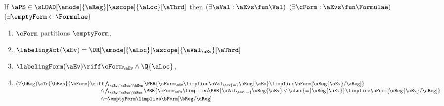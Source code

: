 \begin{scope}
  \smallskip
  \noindent
  \begin{minipage}{1.0\linewidth}
  If $\aPS \in \sLOAD[\amode]{\aReg}[\ascope]{\aLoc}[\aThrd]$ then
  $(\exists\aVal:\aEvs\fun\Val)$
  $(\exists\cForm:\aEvs\fun\Formulae)$ 
  $(\exists\emptyForm\in\Formulae)$
  \begin{multicols}{2}
  \begin{enumerate}[topsep=0pt,label=(\textsc{r}\arabic*),ref=\textsc{r}\arabic*]
  \item \label{read-E-ca}
    $\cForm$ partitions $\emptyForm$,
  \item \label{read-lambda-ca}
    $\labelingAct(\aEv) = \DR[\amode]{\aLoc}[\ascope]{\aVal_\aEv}[\aThrd]$
  \item \label{read-kappa-ca}
    \begin{math}
      \labelingForm(\aEv) \riff      
      \cForm_\aEv
      \land\Q{\aLoc}
    \end{math},
  \item \label{read-tau-ca}
    \begin{math}
      \begin{aligned}[t]
        (\forall\bReg)
        \aTr{\bEvs}{\bForm} \riff
        &\textstyle\bigwedge_{\aEv\in\aEvs\cap\bEvs}
        \PBR{
          \cForm_\aEv
          \limplies \aVal_\aEv{=}\uReg{\aEv}
          \limplies \bForm[\uReg{\aEv}/\aReg]
        }
        \\[-.5ex]
        \land
        &\textstyle\bigwedge_{\aEv\in\aEvs\setminus\bEvs}
        \PBR{
          \cForm_\aEv 
          \limplies
          \PBR{\aVal_\aEv{=}\uReg{\aEv} \lor \aLoc{=}\uReg{\aEv}}
          \limplies
          \bForm[\uReg{\aEv}/\aReg]
        }
        \\[-.5ex]
        \land
        &
        \lnot\emptyForm
        \limplies 
        \bForm[\bReg/\aReg]
      \end{aligned}
    \end{math}
    \columnbreak
      

\end{enumerate}
\end{multicols}
\end{minipage}
\end{scope}
